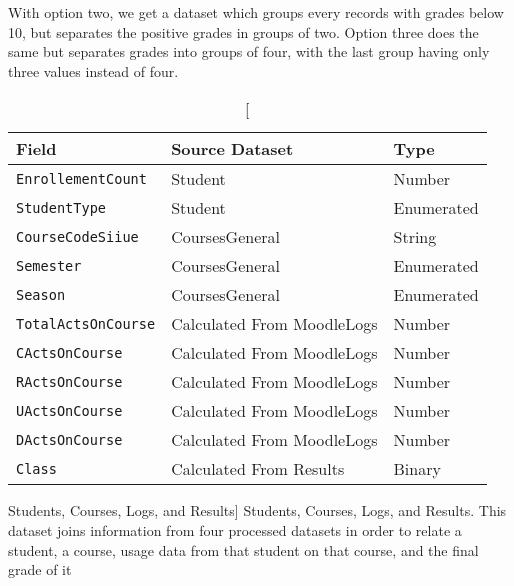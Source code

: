 With option two, we get a dataset which groups every records with grades below
10, but separates the positive grades in groups of two. Option three does the
same but separates grades into groups of four, with the last group having only
three values instead of four.

\begin{table}[h!]
    \centering

    \begin{tabular}{| l | l | l |}
        \hline
        \textbf{Field}             & \textbf{Source Dataset}    & \textbf{Type} \\ \hline
        \texttt{EnrollementCount}  & Student                    & Number        \\ \hline
        \texttt{StudentType}       & Student                    & Enumerated    \\ \hline
        \texttt{CourseCodeSiiue}   & CoursesGeneral             & String        \\ \hline
        \texttt{Semester}          & CoursesGeneral             & Enumerated    \\ \hline
        \texttt{Season}            & CoursesGeneral             & Enumerated    \\ \hline
        \texttt{TotalActsOnCourse} & Calculated From MoodleLogs & Number        \\ \hline
        \texttt{CActsOnCourse}     & Calculated From MoodleLogs & Number        \\ \hline
        \texttt{RActsOnCourse}     & Calculated From MoodleLogs & Number        \\ \hline
        \texttt{UActsOnCourse}     & Calculated From MoodleLogs & Number        \\ \hline
        \texttt{DActsOnCourse}     & Calculated From MoodleLogs & Number        \\ \hline
        \texttt{Class}             & Calculated From Results    & Binary        \\ \hline
    \end{tabular}

    \caption
        [Students, Courses, Logs, and Results]
        {Students, Courses, Logs, and Results. This dataset joins information
        from four processed datasets in order to relate a student, a course,
        usage data from that student on that course, and the final grade of it}

    \label{tab:dat_001}
\end{table}

